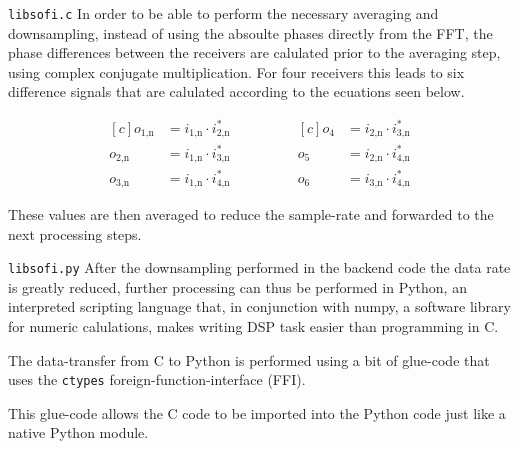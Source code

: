 \begin{subchapter}{\texttt{libsofi.c}}
  In order to be able to perform the necessary averaging
  and downsampling, instead of using the absoulte phases
  directly from the FFT, the phase differences between the receivers
  are calulated prior to the averaging step, using complex conjugate multiplication.
  For four receivers this leads to six difference signals
  that are calulated according to the ecuations seen below.

  \begin{equation*}
    \begin{aligned}[c]
      o_\text{1,n}&= i_\text{1,n} \cdot i_\text{2,n}^{\ast} \\
      o_\text{2,n}&= i_\text{1,n} \cdot i_\text{3,n}^{\ast} \\
      o_\text{3,n}&= i_\text{1,n} \cdot i_\text{4,n}^{\ast}
    \end{aligned}
    \qquad \qquad
    \begin{aligned}[c]
      o_\text{4}&= i_\text{2,n} \cdot i_\text{3,n}^{\ast} \\
      o_\text{5}&= i_\text{2,n} \cdot i_\text{4,n}^{\ast} \\
      o_\text{6}&= i_\text{3,n} \cdot i_\text{4,n}^{\ast}
    \end{aligned}
  \end{equation*}

  These values are then averaged to reduce the sample-rate
  and forwarded to the next processing steps.
\end{subchapter}

\begin{subchapter}{\texttt{libsofi.py}}
  After the downsampling performed in the backend code
  the data rate is greatly reduced, further processing
  can thus be performed in Python, an interpreted scripting
  language that, in conjunction with numpy, a software library for
  numeric calulations, makes writing DSP task easier
  than programming in C.

  The data-transfer from C to Python is performed using
  a bit of glue-code that uses the \texttt{ctypes}
  foreign-function-interface (FFI).

  This glue-code allows the C code to be imported
  into the Python code just like a native Python module.
\end{subchapter}

